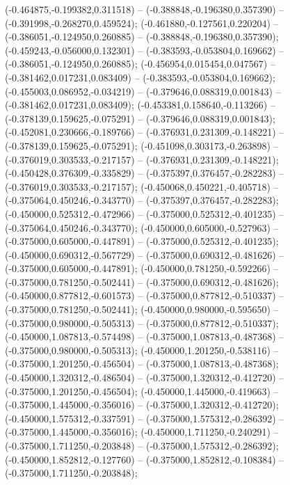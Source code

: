  (-0.464875,-0.199382,0.311518) -- (-0.388848,-0.196380,0.357390) -- (-0.391998,-0.268270,0.459524);
 (-0.461880,-0.127561,0.220204) -- (-0.386051,-0.124950,0.260885) -- (-0.388848,-0.196380,0.357390);
 (-0.459243,-0.056000,0.132301) -- (-0.383593,-0.053804,0.169662) -- (-0.386051,-0.124950,0.260885);
 (-0.456954,0.015454,0.047567) -- (-0.381462,0.017231,0.083409) -- (-0.383593,-0.053804,0.169662);
 (-0.455003,0.086952,-0.034219) -- (-0.379646,0.088319,0.001843) -- (-0.381462,0.017231,0.083409);
 (-0.453381,0.158640,-0.113266) -- (-0.378139,0.159625,-0.075291) -- (-0.379646,0.088319,0.001843);
 (-0.452081,0.230666,-0.189766) -- (-0.376931,0.231309,-0.148221) -- (-0.378139,0.159625,-0.075291);
 (-0.451098,0.303173,-0.263898) -- (-0.376019,0.303533,-0.217157) -- (-0.376931,0.231309,-0.148221);
 (-0.450428,0.376309,-0.335829) -- (-0.375397,0.376457,-0.282283) -- (-0.376019,0.303533,-0.217157);
 (-0.450068,0.450221,-0.405718) -- (-0.375064,0.450246,-0.343770) -- (-0.375397,0.376457,-0.282283);
 (-0.450000,0.525312,-0.472966) -- (-0.375000,0.525312,-0.401235) -- (-0.375064,0.450246,-0.343770);
 (-0.450000,0.605000,-0.527963) -- (-0.375000,0.605000,-0.447891) -- (-0.375000,0.525312,-0.401235);
 (-0.450000,0.690312,-0.567729) -- (-0.375000,0.690312,-0.481626) -- (-0.375000,0.605000,-0.447891);
 (-0.450000,0.781250,-0.592266) -- (-0.375000,0.781250,-0.502441) -- (-0.375000,0.690312,-0.481626);
 (-0.450000,0.877812,-0.601573) -- (-0.375000,0.877812,-0.510337) -- (-0.375000,0.781250,-0.502441);
 (-0.450000,0.980000,-0.595650) -- (-0.375000,0.980000,-0.505313) -- (-0.375000,0.877812,-0.510337);
 (-0.450000,1.087813,-0.574498) -- (-0.375000,1.087813,-0.487368) -- (-0.375000,0.980000,-0.505313);
 (-0.450000,1.201250,-0.538116) -- (-0.375000,1.201250,-0.456504) -- (-0.375000,1.087813,-0.487368);
 (-0.450000,1.320312,-0.486504) -- (-0.375000,1.320312,-0.412720) -- (-0.375000,1.201250,-0.456504);
 (-0.450000,1.445000,-0.419663) -- (-0.375000,1.445000,-0.356016) -- (-0.375000,1.320312,-0.412720);
 (-0.450000,1.575312,-0.337591) -- (-0.375000,1.575312,-0.286392) -- (-0.375000,1.445000,-0.356016);
 (-0.450000,1.711250,-0.240291) -- (-0.375000,1.711250,-0.203848) -- (-0.375000,1.575312,-0.286392);
 (-0.450000,1.852812,-0.127760) -- (-0.375000,1.852812,-0.108384) -- (-0.375000,1.711250,-0.203848);
